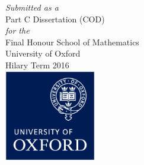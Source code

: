 
\begin{titlepage}
    \date{}
    \maketitle
    \vspace{-1em}
    \centering\large

    \textit{Submitted as a}\\[0.3em]
    {\sc Part C Dissertation (COD)}\\[0.3em]
    \textit{for the}\\[0.3em]
    {\sc Final Honour School of Mathematics}\\[4em]

    University of Oxford\\
    Hilary Term 2016\\[4em]

    \includegraphics[width=4cm]{images/ox_brand_cmyk_rev.eps}

    \thispagestyle{empty}
\end{titlepage}
